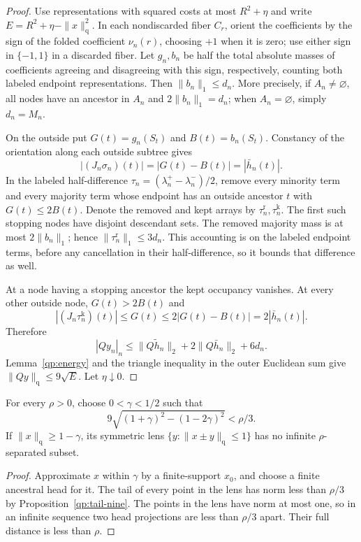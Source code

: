 \begin{proof}
Use representations with squared costs at most $R^2+\eta$ and
write $E=R^2+\eta-\|x\|_{\mathrm q}^2$.
In each nondiscarded fiber $C_r$, orient the coefficients by the sign of
the folded coefficient $\nu_n(r)$, choosing $+1$ when it is zero; use either
sign in $\{-1,1\}$ in a discarded fiber.  Let $g_n,b_n$ be
half the total absolute masses of coefficients agreeing and
disagreeing with this sign, respectively, counting both labeled
endpoint representations.  Then $\|b_n\|_1\le d_n$.  More
precisely, if $A_n\ne\varnothing$, all nodes have an ancestor in
$A_n$ and $2\|b_n\|_1=d_n$; when $A_n=\varnothing$, simply
$d_n=M_n$.

On the outside put $G(t)=g_n(S_t)$ and $B(t)=b_n(S_t)$.  Constancy
of the orientation along each outside subtree gives
\[
 |(J_n\sigma_n)(t)|=|G(t)-B(t)|=|\bar h_n(t)|.
\]
In the labeled half-difference
$\tau_n=(\lambda_n^+-\lambda_n^-)/2$, remove every minority
term and every majority term whose endpoint has an outside
ancestor $t$ with $G(t)\le2B(t)$.  Denote the removed and kept
arrays by $\tau_n^{\mathrm r},\tau_n^{\mathrm k}$.
The first such stopping nodes have disjoint descendant sets.
The removed majority mass is at most $2\|b_n\|_1$; hence
$\|\tau_n^{\mathrm r}\|_1\le3d_n$.  This accounting is on
the labeled endpoint terms, before any cancellation in their
half-difference, so it bounds that difference as well.

At a node having a stopping ancestor the kept occupancy vanishes.
At every other outside node, $G(t)>2B(t)$ and
\[
 |(J_n\tau_n^{\mathrm k})(t)|
 \le G(t)\le2|G(t)-B(t)|=2|\bar h_n(t)|.
\]
Therefore
\[
 |Qy_n|_n\le\|Q\widetilde h_n\|_2
                  +2\|Q\bar h_n\|_2+6d_n.
\]
Lemma~\ref{qp:energy} and the triangle inequality in the outer
Euclidean sum give $\|Qy\|_{\mathrm q}\le9\sqrt E$.
Let $\eta\downarrow0$.
\end{proof}

\begin{corollary}\label{qp:lens-nine}
For every $\rho>0$, choose $0<\gamma<1/2$ such that
\[
 9\sqrt{(1+\gamma)^2-(1-2\gamma)^2}<\rho/3.
\]
If $\|x\|_{\mathrm q}\ge1-\gamma$, its symmetric lens
$\{y:\|x\pm y\|_{\mathrm q}\le1\}$ has no infinite
$\rho$-separated subset.
\end{corollary}

\begin{proof}
Approximate $x$ within $\gamma$ by a finite-support $x_0$, and
choose a finite ancestral head for it.  The tail of every point
in the lens has norm less than $\rho/3$ by
Proposition~\ref{qp:tail-nine}.  The points in the lens have norm
at most one, so in an infinite sequence two head projections are
less than $\rho/3$ apart.  Their full distance is less than $\rho$.
\end{proof}

